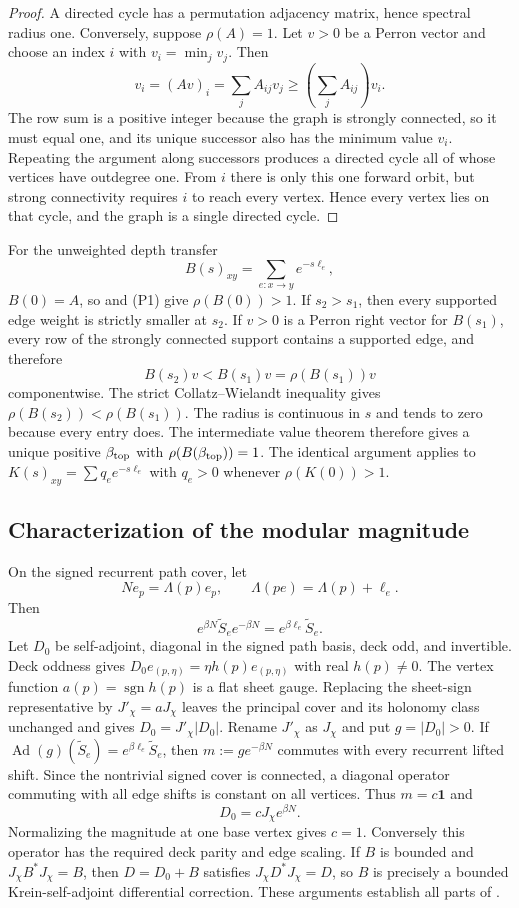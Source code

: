 \documentclass[11pt]{article}
\theoremstyle{definition}
\theoremstyle{remark}
\newcommand{\one}{\mathbf 1}
\newcommand{\Ad}{\operatorname{Ad}}
\newcommand{\sgn}{\operatorname{sgn}}
\begin{document}
\begin{proof}
A directed cycle has a permutation adjacency matrix, hence spectral radius one.
Conversely, suppose $\rho(A)=1$.  Let $v>0$ be a Perron vector and choose an
index $i$ with $v_i=\min_jv_j$.  Then
\[
 v_i=(Av)_i=\sum_jA_{ij}v_j
 \ge\left(\sum_jA_{ij}\right)v_i.
\]
The row sum is a positive integer because the graph is strongly connected, so
it must equal one, and its unique successor also has the minimum value $v_i$.
Repeating the argument along successors produces a directed cycle all of whose
vertices have outdegree one.  From $i$ there is only this one forward orbit, but
strong connectivity requires $i$ to reach every vertex.  Hence every vertex
lies on that cycle, and the graph is a single directed cycle.
\end{proof}

For the unweighted depth transfer
\[
  B(s)_{xy}=\sum_{e:x\to y}e^{-s\ell_e},
\]
$B(0)=A$, so  and \textup{(P1)} give
$\rho(B(0))>1$.  If $s_2>s_1$, then every supported edge weight is strictly smaller at
$s_2$.  If $v>0$ is a Perron right vector for $B(s_1)$, every row of the
strongly connected support contains a supported edge, and therefore
\[
  B(s_2)v<B(s_1)v=\rho(B(s_1))v
\]
componentwise.  The strict Collatz--Wielandt inequality gives
$\rho(B(s_2))<\rho(B(s_1))$.  The radius is continuous in $s$ and tends to zero
because every entry does.  The intermediate value theorem therefore gives a
unique positive $\beta_{\rm top}$ with $\rho(B(\beta_{\rm top}))=1$.
The identical argument applies to
$K(s)_{xy}=\sum q_e e^{-s\ell_e}$ with $q_e>0$ whenever $\rho(K(0))>1$.

\subsection{Characterization of the modular magnitude}

On the signed recurrent path cover, let
\[
  Ne_p=\Lambda(p)e_p,
  \qquad \Lambda(pe)=\Lambda(p)+\ell_e.
\]
Then
\[
 e^{\beta N}\widetilde S_e e^{-\beta N}
 =e^{\beta\ell_e}\widetilde S_e.
\]
Let $D_0$ be self-adjoint, diagonal in the signed path basis, deck odd, and
invertible.  Deck oddness gives
$D_0e_{(p,\eta)}=\eta h(p)e_{(p,\eta)}$ with real $h(p)\ne0$.  The vertex
function $a(p)=\sgn h(p)$ is a flat sheet gauge.  Replacing the sheet-sign
representative by $J'_\chi=aJ_\chi$ leaves the principal cover and its holonomy
class unchanged and gives $D_0=J'_\chi|D_0|$.  Rename $J'_\chi$ as $J_\chi$
and put $g=|D_0|>0$.  If
$\Ad(g)(\widetilde S_e)=e^{\beta\ell_e}\widetilde S_e$, then
$m:=ge^{-\beta N}$ commutes with every recurrent lifted shift.  Since the
nontrivial signed cover is connected, a diagonal operator commuting with all
edge shifts is constant on all vertices.  Thus $m=c\one$ and
\[
  D_0=cJ_\chi e^{\beta N}.
\]
Normalizing the magnitude at one base vertex gives $c=1$.  Conversely this
operator has the required deck parity and edge scaling.  If $B$ is bounded and
$J_\chi B^*J_\chi=B$, then
$D=D_0+B$ satisfies $J_\chi D^*J_\chi=D$, so $B$ is precisely a bounded
Krein-self-adjoint differential correction.  These arguments establish all
parts of .
\end{document}
